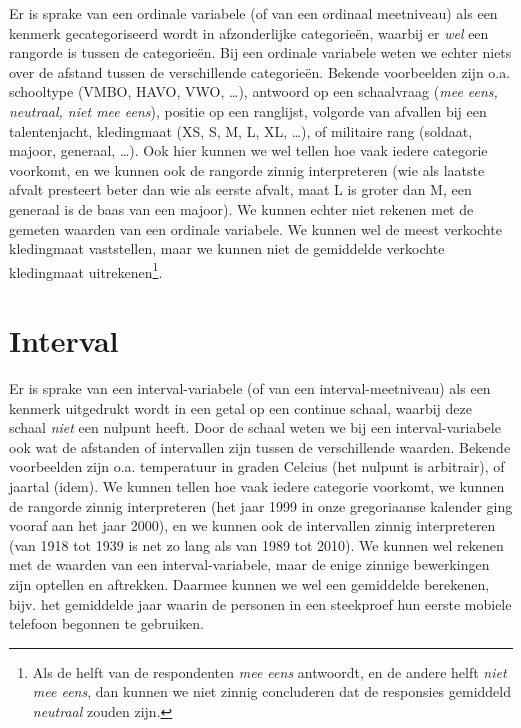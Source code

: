 \documentclass[
]{book}
\begin{document}
Er is sprake van een ordinale variabele (of van een ordinaal meetniveau)
als een kenmerk gecategoriseerd wordt in afzonderlijke categorieën,
waarbij er \emph{wel} een rangorde is tussen de categorieën. Bij een ordinale
variabele weten we echter niets over de afstand tussen de verschillende
categorieën. Bekende voorbeelden zijn o.a. schooltype (VMBO, HAVO, VWO,
\ldots), antwoord op een schaalvraag (\emph{mee eens, neutraal, niet mee eens}),
positie op een ranglijst, volgorde van afvallen bij een talentenjacht,
kledingmaat (XS, S, M, L, XL, \ldots), of militaire rang (soldaat, majoor,
generaal, \ldots). Ook hier kunnen we wel tellen hoe vaak iedere categorie
voorkomt, en we kunnen ook de rangorde zinnig interpreteren (wie als
laatste afvalt presteert beter dan wie als eerste afvalt, maat L is
groter dan M, een generaal is de baas van een majoor). We kunnen echter
niet rekenen met de gemeten waarden van een ordinale variabele. We
kunnen wel de meest verkochte kledingmaat vaststellen, maar we kunnen
niet de gemiddelde verkochte kledingmaat uitrekenen\footnote{Als de helft van de respondenten \emph{mee eens} antwoordt, en de andere helft \emph{niet mee eens}, dan kunnen we niet zinnig concluderen dat de responsies gemiddeld \emph{neutraal} zouden zijn.}.

\hypertarget{sec:interval}{%
\section{Interval}\label{sec:interval}}

Er is sprake van een interval-variabele (of van een interval-meetniveau)
als een kenmerk uitgedrukt wordt in een getal op een continue schaal,
waarbij deze schaal \emph{niet} een nulpunt heeft. Door de schaal weten we
bij een interval-variabele ook wat de afstanden of intervallen zijn
tussen de verschillende waarden. Bekende voorbeelden zijn o.a.
temperatuur in graden Celcius (het nulpunt is arbitrair), of jaartal
(idem). We kunnen tellen hoe vaak iedere categorie voorkomt, we kunnen
de rangorde zinnig interpreteren (het jaar 1999 in onze gregoriaanse
kalender ging vooraf aan het jaar 2000), en we kunnen ook de intervallen
zinnig interpreteren (van 1918 tot 1939 is net zo lang als van 1989 tot
2010). We kunnen wel rekenen met de waarden van een interval-variabele,
maar de enige zinnige bewerkingen zijn optellen en aftrekken. Daarmee
kunnen we wel een gemiddelde berekenen, bijv. het gemiddelde jaar waarin de
personen in een steekproef hun eerste mobiele telefoon begonnen te gebruiken.
\end{document}

